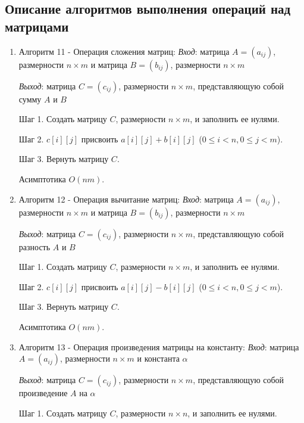 \documentclass[spec, och, labwork]{shiza}
\begin{document}
\subsection{Описание алгоритмов выполнения операций над матрицами}
            \begin{enumerate}
                \item Алгоритм 11 - Операция сложения матриц:
                \textit{Вход}: матрица $A = (a_{ij})$, размерности $n \times m$ и матрица $B = (b_{ij})$, размерности $n \times m$

                \textit{Выход}: матрица $C = (c_{ij})$, размерности $n \times m$, представляющую собой сумму $A$ и $B$

                Шаг 1. Создать матрицу $C$, размерности $n \times m$, и заполнить ее нулями.

                Шаг 2. $c[i][j]$ присвоить $a[i][j] + b[i][j]$ ($0 \leq i < n, 0 \leq j < m$).

                Шаг 3. Вернуть матрицу $C$.

                Асимптотика $O(nm)$.

                \item Алгоритм 12 - Операция вычитание матриц:
                \textit{Вход}: матрица $A = (a_{ij})$, размерности $n \times m$ и матрица $B = (b_{ij})$, размерности $n \times m$

                \textit{Выход}: матрица $C = (c_{ij})$, размерности $n \times m$, представляющую собой разность $A$ и $B$

                Шаг 1. Создать матрицу $C$, размерности $n \times m$, и заполнить ее нулями.

                Шаг 2. $c[i][j]$ присвоить $a[i][j] - b[i][j]$ ($0 \leq i < n, 0 \leq j < m$).

                Шаг 3. Вернуть матрицу $C$.

                Асимптотика $O(nm)$.

                \item Алгоритм 13 - Операция произведения матрицы на константу:
                \textit{Вход}: матрица $A = (a_{ij})$, размерности $n \times m$ и константа $\alpha$

                \textit{Выход}: матрица $C = (c_{ij})$, размерности $n \times m$, представляющую собой произведение $A$ на $\alpha$

                Шаг 1. Создать матрицу $C$, размерности $n \times n$, и заполнить ее нулями.


\end{enumerate}
\end{document}
